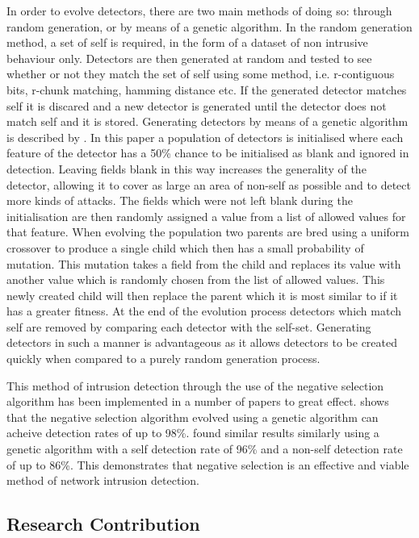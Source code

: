 	In order to evolve detectors, there are two main methods of doing so: through random generation, or by means of a genetic algorithm. In the random generation method, a set of self is required, in the form of a dataset of non intrusive behaviour only. Detectors are then generated at random and tested to see whether or not they match the set of self using some method, i.e. r-contiguous bits, r-chunk matching, hamming distance etc. If the generated detector matches self it is discared and a new detector is generated until the detector does not match self and it is stored. Generating detectors by means of a genetic algorithm is described by \cite{powers2008hybrid}. In this paper a population of detectors is initialised where each feature of the detector has a 50\% chance to be initialised as blank and ignored in detection. Leaving fields blank in this way increases the generality of the detector, allowing it to cover as large an area of non-self as possible and to detect more kinds of attacks. The fields which were not left blank during the initialisation are then randomly assigned a value from a list of allowed values for that feature. When evolving the population two parents are bred using a uniform crossover to produce a single child which then has a small probability of mutation. This mutation takes a field from the child and replaces its value with another value which is randomly chosen from the list of allowed values. This newly created child will then replace the parent which it is most similar to if it has a greater fitness. At the end of the evolution process detectors which match self are removed by comparing each detector with the self-set. Generating detectors in such a manner is advantageous as it allows detectors to be created quickly when compared to a purely random generation process.
	
	This method of intrusion detection through the use of the negative selection algorithm has been implemented in a number of papers to great effect. \cite{powers2008hybrid} shows that the negative selection algorithm evolved using a genetic algorithm can acheive detection rates of up to 98\%. \cite{dasgupta2002immunity} found similar results similarly using a genetic algorithm with a self detection rate of 96\% and a non-self detection rate of up to 86\%. This demonstrates that negative selection is an effective and viable method of network intrusion detection.
	
	\subsection{Research Contribution} \label{Research Contribution}
	
